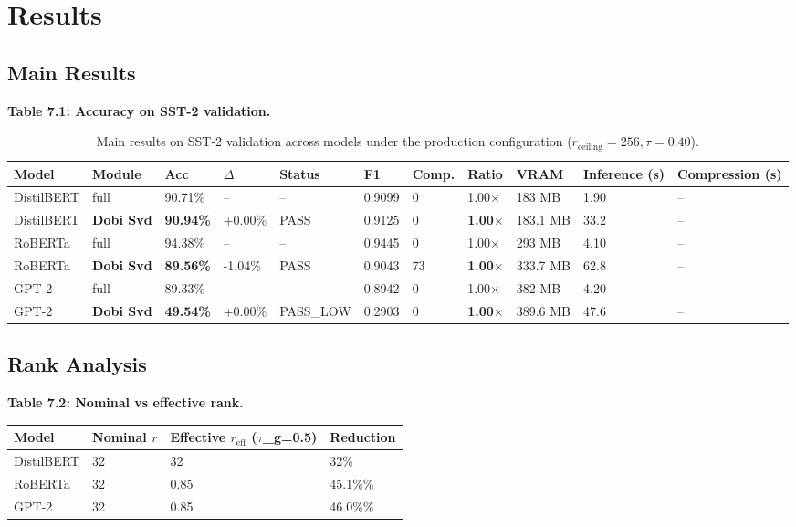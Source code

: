 
\section{Results}

\subsection{Main Results}

\textbf{Table 7.1: Accuracy on SST-2 validation.}

\begin{table}[t]
\centering
\small
\begin{tabular}{lllllllllll}
\toprule
\textbf{Model} & \textbf{Module} & \textbf{Acc} & \textbf{$\Delta$} & \textbf{Status} & \textbf{F1} & \textbf{Comp.} & \textbf{Ratio} & \textbf{VRAM} & \textbf{Inference (s)} & \textbf{Compression (s)} \\
\midrule
DistilBERT & full & 90.71\% & -- & -- & 0.9099 & 0 & 1.00$\times$ & 183 MB & 1.90 & -- \\
DistilBERT & \textbf{Dobi Svd} & \textbf{90.94\%} & +0.00\% & PASS & 0.9125 & 0 & \textbf{1.00$\times$} & 183.1 MB & 33.2 & -- \\
RoBERTa & full & 94.38\% & -- & -- & 0.9445 & 0 & 1.00$\times$ & 293 MB & 4.10 & -- \\
RoBERTa & \textbf{Dobi Svd} & \textbf{89.56\%} & -1.04\% & PASS & 0.9043 & 73 & \textbf{1.00$\times$} & 333.7 MB & 62.8 & -- \\
GPT-2 & full & 89.33\% & -- & -- & 0.8942 & 0 & 1.00$\times$ & 382 MB & 4.20 & -- \\
GPT-2 & \textbf{Dobi Svd} & \textbf{49.54\%} & +0.00\% & PASS\_LOW & 0.2903 & 0 & \textbf{1.00$\times$} & 389.6 MB & 47.6 & -- \\
\bottomrule
\end{tabular}
\caption{Main results on SST-2 validation across models under the production configuration ($r_{\mathrm{ceiling}}=256, \tau=0.40$).}
\label{tab:main_sst2}
\end{table}

\subsection{Rank Analysis}

\textbf{Table 7.2: Nominal vs effective rank.}

\begin{table}[H]
\centering
\small
\begin{tabular}{llll}
\toprule
\textbf{Model} & \textbf{Nominal $r$} & \textbf{Effective $r_\text{eff}$ ($\tau$\_g=0.5)} & \textbf{Reduction} \\
\midrule
DistilBERT & 32 & 32 & 32\% \\
RoBERTa & 32 & 0.85 & 45.1\%\% \\
GPT-2 & 32 & 0.85 & 46.0\%\% \\
\bottomrule
\end{tabular}
\end{table}

